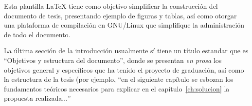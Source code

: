 Esta plantilla LaTeX tiene como objetivo simplificar la construcción del
documento de tesis, presentando ejemplo de figuras y tablas, así como otorgar
una plataforma de compilación en GNU/Linux que simplifique la administración de
todo el documento.

La última sección de la introducción usualmente sí tiene un título estandar que
es ``Objetivos y estructura del documento'', donde se presentan \emph{en prosa}
los objetivos general y específicos que ha tenido el proyecto de graduación,
así como la estructura de la tesis (por ejemplo, ``en el siguiente capítulo se
esbozan los fundamentos teóricos necesarios para explicar en el
capítulo~\ref{ch:solucion} la propuesta realizada$\ldots$''

